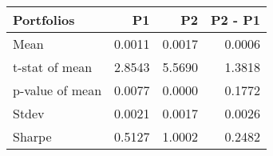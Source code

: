 \begin{tabular}{lrrr}
\toprule
Portfolios & P1 & P2 & P2 - P1 \\
\midrule
Mean & 0.0011 & 0.0017 & 0.0006 \\
t-stat of mean & 2.8543 & 5.5690 & 1.3818 \\
p-value of mean & 0.0077 & 0.0000 & 0.1772 \\
Stdev & 0.0021 & 0.0017 & 0.0026 \\
Sharpe & 0.5127 & 1.0002 & 0.2482 \\
\bottomrule
\end{tabular}

